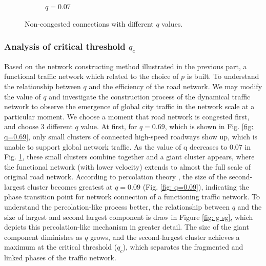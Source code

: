 \begin{figure}[htb]
\begin{subfigure}[b]{0.25\textwidth}
    \caption{$q=0.07$}
    \label{fig: q=0.07}
\end{subfigure}
\caption{Non-congested connections with different $q$ values.}
\label{fig: conn q}
\end{figure}

\subsubsection{Analysis of critical threshold $q_c$}
Based on the network constructing method illustrated in the previous part, a functional traffic network which related to the choice of $p$ is built. To understand the relationship between $q$ and the efficiency of the road network. We may modify the value of $q$ and investigate the construction process of the dynamical traffic network to observe the emergence of global city traffic in the network scale at a particular moment. We choose a moment that road network is congested first, and choose 3 different $q$ value. At first, for $q=0.69$, which is shown in Fig. \ref{fig: q=0.69}, only small clusters of connected high-speed roadways show up, which is unable to support global network traffic. As the value of q decreases to 0.07 in Fig. \ref{fig: q=0.07}, these small clusters combine together and a giant cluster appears, where the functional network (with lower velocity) extends to almost the full scale of original road network. According to percolation theory \cite{li2015percolation, zeng2019switch}, the size of the second-largest cluster becomes greatest at $q = 0.09$ (Fig. \ref{fig: q=0.09}), indicating the phase transition point for network connection of a functioning traffic network. To understand the percolation-like process better, the relationship between $q$ and the size of largest and second largest component is draw in Figure \ref{fig: g sg}, which depicts this percolation-like mechanism in greater detail. The size of the giant component diminishes as $q$ grows, and the second-largest cluster achieves a maximum at the critical threshold ($q_c$), which separates the fragmented and linked phases of the traffic network.


